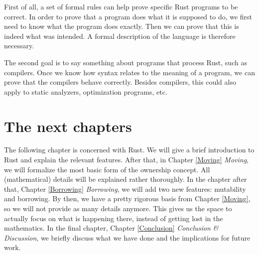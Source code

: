 First of all, a set of formal rules can help prove specific Rust programs to be correct. In order to prove that a program does what it is supposed to do, we first need to know what the program does exactly. Then we can prove that this is indeed what was intended. A formal description of the language is therefore necessary. 

The second goal is to say something about programs that process Rust, such as compilers. Once we know how syntax relates to the meaning of a program, we can prove that the compilers behave correctly. Besides compilers, this could also apply to static analyzers, optimization programs, etc.

\section{The next chapters}
The following chapter is concerned with Rust. We will give a brief introduction to Rust and explain the relevant features. After that, in Chapter \ref{Moving} \emph{Moving}, we will formalize the most basic form of the ownership concept. All (mathematical) details will be explained rather thoroughly. In the chapter after that, Chapter \ref{Borrowing} \emph{Borrowing}, we will add two new features: mutability and borrowing. By then, we have a pretty rigorous basis from Chapter \ref{Moving}, so we will not provide as many details anymore. This gives us the space to actually focus on what is happening there, instead of getting lost in the mathematics. In the final chapter, Chapter \ref{Conclusion} \emph{Conclusion \& Discussion}, we briefly discuss what we have done and the implications for future work. 

